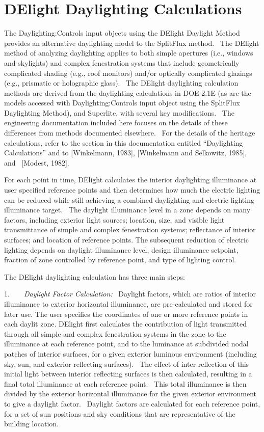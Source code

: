 \section{DElight Daylighting Calculations}\label{delight-daylighting-calculations}

The Daylighting:Controls input objects using the DElight Daylight Method provides an alternative daylighting model to the SplitFlux method.~ The DElight method of analyzing daylighting applies to both simple apertures (i.e., windows and skylights) and complex fenestration systems that include geometrically complicated shading (e.g., roof monitors) and/or optically complicated glazings (e.g., prismatic or holographic glass).~ The DElight daylighting calculation methods are derived from the daylighting calculations in DOE-2.1E (as are the models accessed with Daylighting:Controls input object using the SplitFlux Daylighting Method), and Superlite, with several key modifications.~ The engineering documentation included here focuses on the details of these differences from methods documented elsewhere.~ For the details of the heritage calculations, refer to the section in this documentation entitled ``Daylighting Calculations'' and to {[}Winkelmann, 1983{]}, {[}Winkelmann and Selkowitz, 1985{]}, and~ {[}Modest, 1982{]}.

For each point in time, DElight calculates the interior daylighting illuminance at user specified reference points and then determines how much the electric lighting can be reduced while still achieving a combined daylighting and electric lighting illuminance target.~ The daylight illuminance level in a zone depends on many factors, including exterior light sources; location, size, and visible light transmittance of simple and complex fenestration systems; reflectance of interior surfaces; and location of reference points. The subsequent reduction of electric lighting depends on daylight illuminance level, design illuminance setpoint, fraction of zone controlled by reference point, and type of lighting control.

The DElight daylighting calculation has three main steps:

1.~~~~\emph{Daylight Factor Calculation:}~ Daylight factors, which are ratios of interior illuminance to exterior horizontal illuminance, are pre-calculated and stored for later use. The user specifies the coordinates of one or more reference points in each daylit zone. DElight first calculates the contribution of light transmitted through all simple and complex fenestration systems in the zone to the illuminance at each reference point, and to the luminance at subdivided nodal patches of interior surfaces, for a given exterior luminous environment (including sky, sun, and exterior reflecting surfaces).~ The effect of inter-reflection of this initial light between interior reflecting surfaces is then calculated, resulting in a final total illuminance at each reference point.~ This total illuminance is then divided by the exterior horizontal illuminance for the given exterior environment to give a daylight factor.~ Daylight factors are calculated for each reference point, for a set of sun positions and sky conditions that are representative of the building location.

